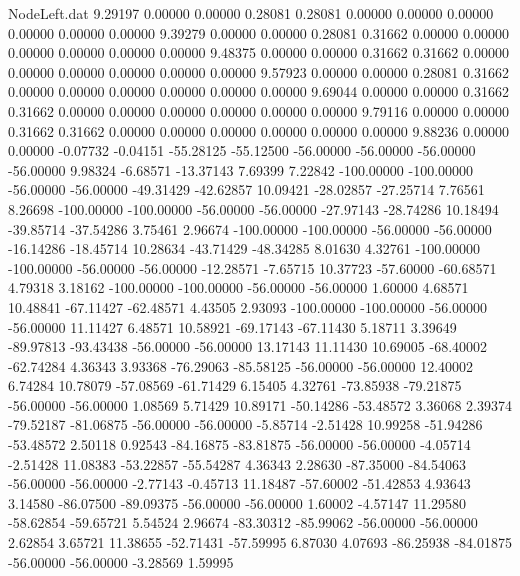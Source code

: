 \begin{filecontents}{NodeLeft.dat}
   9.29197    0.00000    0.00000     0.28081    0.28081    0.00000    0.00000    0.00000    0.00000    0.00000    0.00000
   9.39279    0.00000    0.00000     0.28081    0.31662    0.00000    0.00000    0.00000    0.00000    0.00000    0.00000
   9.48375    0.00000    0.00000     0.31662    0.31662    0.00000    0.00000    0.00000    0.00000    0.00000    0.00000
   9.57923    0.00000    0.00000     0.28081    0.31662    0.00000    0.00000    0.00000    0.00000    0.00000    0.00000
   9.69044    0.00000    0.00000     0.31662    0.31662    0.00000    0.00000    0.00000    0.00000    0.00000    0.00000
   9.79116    0.00000    0.00000     0.31662    0.31662    0.00000    0.00000    0.00000    0.00000    0.00000    0.00000
   9.88236    0.00000    0.00000    -0.07732   -0.04151  -55.28125  -55.12500  -56.00000  -56.00000  -56.00000  -56.00000
   9.98324   -6.68571  -13.37143     7.69399    7.22842 -100.00000 -100.00000  -56.00000  -56.00000  -49.31429  -42.62857
  10.09421  -28.02857  -27.25714     7.76561    8.26698 -100.00000 -100.00000  -56.00000  -56.00000  -27.97143  -28.74286
  10.18494  -39.85714  -37.54286     3.75461    2.96674 -100.00000 -100.00000  -56.00000  -56.00000  -16.14286  -18.45714
  10.28634  -43.71429  -48.34285     8.01630    4.32761 -100.00000 -100.00000  -56.00000  -56.00000  -12.28571   -7.65715
  10.37723  -57.60000  -60.68571     4.79318    3.18162 -100.00000 -100.00000  -56.00000  -56.00000    1.60000    4.68571
  10.48841  -67.11427  -62.48571     4.43505    2.93093 -100.00000 -100.00000  -56.00000  -56.00000   11.11427    6.48571
  10.58921  -69.17143  -67.11430     5.18711    3.39649  -89.97813  -93.43438  -56.00000  -56.00000   13.17143   11.11430
  10.69005  -68.40002  -62.74284     4.36343    3.93368  -76.29063  -85.58125  -56.00000  -56.00000   12.40002    6.74284
  10.78079  -57.08569  -61.71429     6.15405    4.32761  -73.85938  -79.21875  -56.00000  -56.00000    1.08569    5.71429
  10.89171  -50.14286  -53.48572     3.36068    2.39374  -79.52187  -81.06875  -56.00000  -56.00000   -5.85714   -2.51428
  10.99258  -51.94286  -53.48572     2.50118    0.92543  -84.16875  -83.81875  -56.00000  -56.00000   -4.05714   -2.51428
  11.08383  -53.22857  -55.54287     4.36343    2.28630  -87.35000  -84.54063  -56.00000  -56.00000   -2.77143   -0.45713
  11.18487  -57.60002  -51.42853     4.93643    3.14580  -86.07500  -89.09375  -56.00000  -56.00000    1.60002   -4.57147
  11.29580  -58.62854  -59.65721     5.54524    2.96674  -83.30312  -85.99062  -56.00000  -56.00000    2.62854    3.65721
  11.38655  -52.71431  -57.59995     6.87030    4.07693  -86.25938  -84.01875  -56.00000  -56.00000   -3.28569    1.59995

\end{filecontents}
